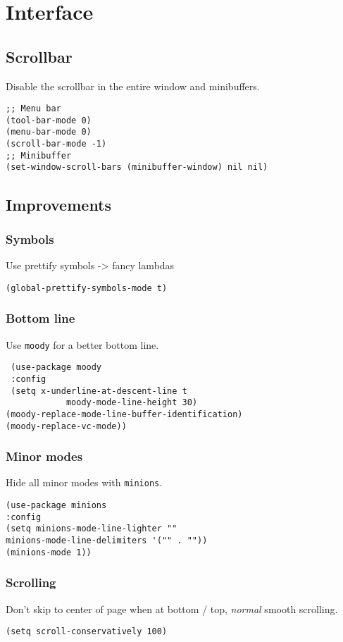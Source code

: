 \documentclass[11pt]{article}
\begin{document}
\section*{Interface}
\label{sec:org6c8a8b3}
\subsection*{Scrollbar}
\label{sec:org9cc1473}
Disable the scrollbar in the entire window and minibuffers.
\begin{verbatim}
;; Menu bar
(tool-bar-mode 0)
(menu-bar-mode 0)
(scroll-bar-mode -1)
;; Minibuffer
(set-window-scroll-bars (minibuffer-window) nil nil)
\end{verbatim}
\subsection*{Improvements}
\label{sec:org6fc3843}
\subsubsection*{Symbols}
\label{sec:orgb9ee2a1}
Use prettify symbols -> fancy lambdas
\begin{verbatim}
(global-prettify-symbols-mode t)
\end{verbatim}
\subsubsection*{Bottom line}
\label{sec:org7bc65aa}
Use \texttt{moody} for a better bottom line.
\begin{verbatim}
 (use-package moody
 :config
 (setq x-underline-at-descent-line t
			moody-mode-line-height 30)
(moody-replace-mode-line-buffer-identification)
(moody-replace-vc-mode))
\end{verbatim}
\subsubsection*{Minor modes}
\label{sec:org6577f31}
Hide all minor modes with \texttt{minions}.
\begin{verbatim}
(use-package minions
:config
(setq minions-mode-line-lighter ""
minions-mode-line-delimiters '("" . ""))
(minions-mode 1))
\end{verbatim}
\subsubsection*{Scrolling}
\label{sec:org026202d}
Don't skip to center of page when at bottom / top, \emph{normal} smooth scrolling.
\begin{verbatim}
(setq scroll-conservatively 100)
\end{verbatim}
\end{document}
